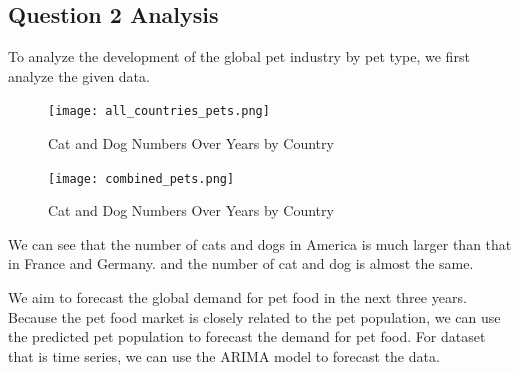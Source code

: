 \documentclass[withoutpreface,bwprint]{cumcmthesis} %
\begin{document}
\subsection{Question 2 Analysis}
To analyze the development of the global pet industry by pet type,
we first analyze the given data.
\clearpage
\begin{figure}[htbp]
	\centering
	\texttt{[image: all\_countries\_pets.png]}
	\caption{Cat and Dog Numbers Over Years by Country}
\end{figure}
\begin{figure}[htbp]
	\centering
	\texttt{[image: combined\_pets.png]}
	\caption{Cat and Dog Numbers Over Years by Country}
\end{figure}
\par We can see that the number of cats and dogs in America is much larger than that in France and Germany.
and the number of cat and dog is almost the same.
\par We aim to forecast the global demand for pet food in the next three years.
Because the pet food market is closely related to the pet population, we can use the predicted pet population to forecast the demand for pet food.
For dataset that is time series, we can use the ARIMA model to forecast the data.
\end{document}
